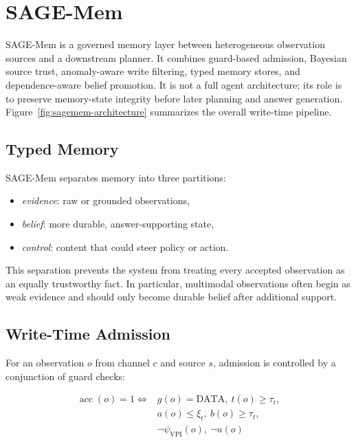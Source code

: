\documentclass{article}
\begin{document}
\section{SAGE-Mem}

SAGE-Mem is a governed memory layer between heterogeneous observation sources and a downstream planner. It combines guard-based admission, Bayesian source trust, anomaly-aware write filtering, typed memory stores, and dependence-aware belief promotion. It is not a full agent architecture; its role is to preserve memory-state integrity before later planning and answer generation. Figure~\ref{fig:sagemem-architecture} summarizes the overall write-time pipeline.

\subsection{Typed Memory}

SAGE-Mem separates memory into three partitions:
\begin{itemize}
\item \emph{evidence}: raw or grounded observations,
\item \emph{belief}: more durable, answer-supporting state,
\item \emph{control}: content that could steer policy or action.
\end{itemize}

This separation prevents the system from treating every accepted observation as an equally trustworthy fact. In particular, multimodal observations often begin as weak evidence and should only become durable belief after additional support.

\subsection{Write-Time Admission}

For an observation \(o\) from channel \(c\) and source \(s\), admission is controlled by a conjunction of guard checks:

\begin{equation}
\begin{aligned}
\operatorname{acc}(o)=1 \iff {} & g(o)=\mathrm{DATA},\ t(o)\ge \tau_t, \\
& a(o)\le \xi_t,\ b(o)\ge \tau_t, \\
& \neg \psi_{\mathrm{VPI}}(o),\ \neg u(o)
\end{aligned}
\end{equation}
\end{document}
